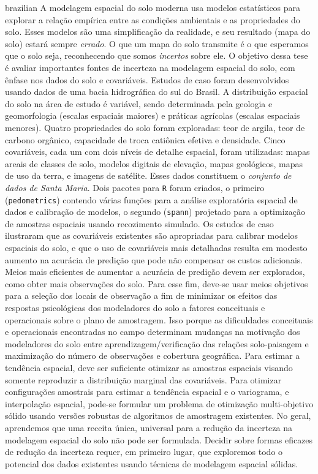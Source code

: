 \documentclass[tese, header, %
twoside, openright,          %
]{UFRuralRJ}
\begin{document}
\generalabstracttrue
\begin{generalabstract}{brazilian}{\tituloPT}{\chavesPT}{\nivelPT}
A modelagem espacial do solo moderna usa modelos estatísticos para explorar a relação empírica entre 
as condições ambientais e as propriedades do solo. Esses modelos são uma simplificação da realidade, e seu 
resultado (mapa do solo) estará sempre \emph{errado}. O que um mapa do solo transmite é o que esperamos que o 
solo seja, reconhecendo que somos \emph{incertos} sobre ele. O objetivo dessa tese é avaliar importantes 
fontes de incerteza na modelagem espacial do solo, com ênfase nos dados do solo e covariáveis. Estudos de 
caso foram desenvolvidos usando dados de uma bacia hidrográfica do sul do Brasil. A distribuição 
espacial do solo na área de estudo é variável, sendo determinada pela geologia e geomorfologia (escalas 
espaciais maiores) e práticas agrícolas (escalas espaciais menores). Quatro propriedades do solo foram 
exploradas: teor de argila, teor de carbono orgânico, capacidade de troca catiônica efetiva e densidade. Cinco 
covariáveis, cada um com dois níveis de detalhe espacial, foram utilizadas: mapas areais de classes de solo, 
modelos digitais de elevação, mapas geológicos, mapas de uso da terra, e imagens de satélite. Esses dados 
constituem o \emph{conjunto de dados de Santa Maria}. Dois pacotes para \texttt{R} foram criados, o primeiro 
(\texttt{pedometrics}) contendo várias funções para a análise exploratória espacial de dados e calibração de 
modelos, o segundo (\texttt{spann}) projetado para a optimização de amostras espaciais usando recozimento 
simulado. Os estudos de caso ilustraram que as covariáveis existentes são apropriadas para calibrar modelos 
espaciais do solo, e que o uso de covariáveis mais detalhadas resulta em modesto aumento na acurácia 
de predição que pode não compensar os custos adicionais. Meios mais eficientes de aumentar a acurácia de 
predição devem ser explorados, como obter mais observações do solo. Para esse fim, deve-se usar meios 
objetivos para a seleção dos locais de observação a fim de minimizar os efeitos das respostas psicológicas dos 
modeladores do solo a fatores conceituais e operacionais sobre o plano de amostragem. Isso porque as 
dificuldades conceituais e operacionais encontradas no campo determinam mudanças na motivação dos modeladores 
do solo entre aprendizagem/verificação das relações solo-paisagem e maximização do número de observações e 
cobertura geográfica. Para estimar a tendência espacial, deve ser suficiente otimizar as amostras espaciais 
visando somente reproduzir a distribuição marginal das covariáveis. Para otimizar configurações amostrais para 
estimar a tendência espacial e o variograma, e interpolação espacial, pode-se formular um problema de 
otimização multi-objetivo sólido usando versões robustas de algoritmos de amostragem existentes. No geral, 
aprendemos que uma receita única, universal para a redução da incerteza na modelagem espacial do solo não pode 
ser formulada. Decidir sobre formas eficazes de redução da incerteza requer, em primeiro lugar, que exploremos 
todo o potencial dos dados existentes usando técnicas de modelagem espacial sólidas.
\end{generalabstract}
\end{document}
